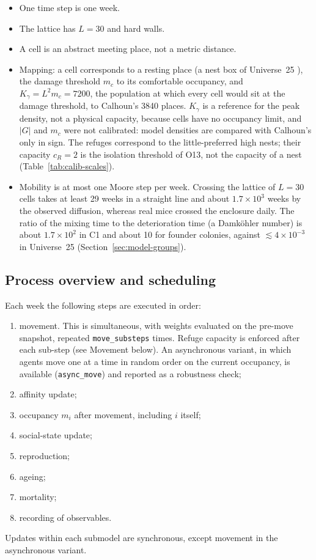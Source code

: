 \begin{itemize}
\item One time step is one week.
\item The lattice has $L=30$ and hard walls.
\item A cell is an abstract meeting place, not a metric distance.
\item Mapping: a cell corresponds to a resting place (a nest box of Universe~25 \cite{Calhoun1973}), the damage
  threshold $m_c$ to its comfortable occupancy, and $K_\gamma=L^2 m_c=7200$, the population at which every cell would
  sit at the damage threshold, to Calhoun's 3840 places. $K_\gamma$ is a reference for the peak density, not a
  physical capacity, because cells have no occupancy limit, and $|G|$ and $m_c$ were not calibrated: model densities
  are compared with Calhoun's only in sign. The refuges correspond to the little-preferred high nests; their capacity
  $c_R=2$ is the isolation threshold of O13, not the capacity of a nest (Table~\ref{tab:calib-scales}).
\item Mobility is at most one Moore step per week. Crossing the lattice of $L=30$ cells takes at least 29 weeks in a
  straight line and about $1.7\times10^3$ weeks by the observed diffusion, whereas real mice crossed the enclosure
  daily. The ratio of the mixing time to the deterioration time (a Damköhler number) is about $1.7\times10^2$ in
  \textsf{C1} and about 10 for founder colonies, against $\lesssim4\times10^{-3}$ in Universe~25
  (Section~\ref{sec:model-groups}).
\end{itemize}

\subsection{Process overview and scheduling}
Each week the following steps are executed in order:
\begin{enumerate}
\item movement. This is simultaneous, with weights evaluated on the pre-move snapshot, repeated
  \texttt{move\_substeps} times. Refuge capacity is enforced after each sub-step (see Movement below). An asynchronous
  variant, in which agents move one at a time in random order on the current occupancy, is available
  (\texttt{async\_move}) and reported as a robustness check;
\item affinity update;
\item occupancy $m_i$ after movement, including $i$ itself;
\item social-state update;
\item reproduction;
\item ageing;
\item mortality;
\item recording of observables.
\end{enumerate}
Updates within each submodel are synchronous, except movement in the asynchronous variant.

